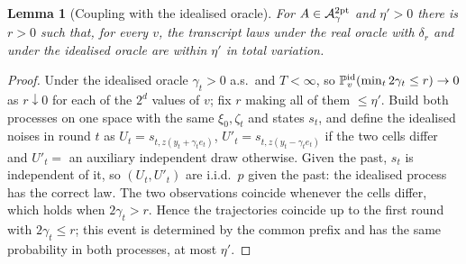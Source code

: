 \documentclass[11pt,a4paper]{article}
\numberwithin{equation}{section}
\newtheorem{lemma}[theorem]{Lemma}
\theoremstyle{definition}
\theoremstyle{remark}
\begin{document}
\begin{lemma}[Coupling with the idealised oracle]\label{lem:couple}
For $A\in\mathcal A^{\rm 2pt}_\gamma$ and $\eta'>0$ there is $r>0$ such that, for every $v$, the transcript laws under the real oracle with $\delta_r$ and under the idealised oracle are within $\eta'$ in total variation.
\end{lemma}
\begin{proof}
Under the idealised oracle $\gamma_t>0$ a.s.\ and $T<\infty$, so $\mathbb P^{\rm id}_v(\min_t2\gamma_t\le r)\to0$ as $r\downarrow0$ for each of the $2^d$ values of $v$; fix $r$ making all of them $\le\eta'$. Build both processes on one space with the same $\xi_0,\zeta_t$ and states $s_t$, and define the idealised noises in round $t$ as $U_t=s_{t,z(y_t+\gamma_te_t)}$, $U'_t=s_{t,z(y_t-\gamma_te_t)}$ if the two cells differ and $U'_t=$ an auxiliary independent draw otherwise. Given the past, $s_t$ is independent of it, so $(U_t,U'_t)$ are i.i.d.\ $p$ given the past: the idealised process has the correct law. The two observations coincide whenever the cells differ, which holds when $2\gamma_t>r$. Hence the trajectories coincide up to the first round with $2\gamma_t\le r$; this event is determined by the common prefix and has the same probability in both processes, at most $\eta'$.
\end{proof}
\end{document}

